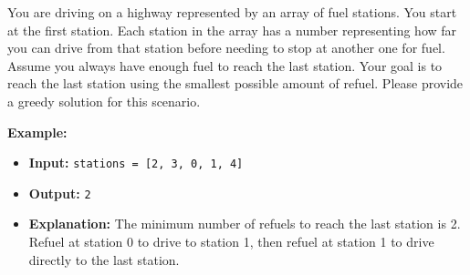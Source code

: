 \problem{}
You are driving on a highway represented by an array of fuel stations. You start at the first station. Each station in the array has a number representing how far you can drive from that station before needing to stop at another one for fuel. Assume you always have enough fuel to reach the last station. Your goal is to reach the last station using the smallest possible amount of refuel. Please provide a greedy solution for this scenario.

\textbf{Example:}

\begin{itemize}
    \item \textbf{Input:} \texttt{stations = [2, 3, 0, 1, 4]}
    \item \textbf{Output:} \texttt{2}
    \item \textbf{Explanation:} The minimum number of refuels to reach the last station is 2. Refuel at station 0 to drive to station 1, then refuel at station 1 to drive directly to the last station.
\end{itemize}

\solution{
}

\newpage